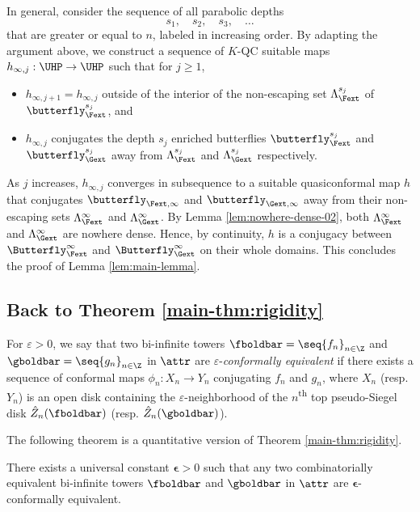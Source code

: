 \documentclass{amsart}
\begin{document}
In general, consider the sequence of all parabolic depths 
\[
    s_1, \quad s_2, \quad s_3, \quad  \ldots
\]
that are greater or equal to $n$, labeled in increasing order. 
By adapting the argument above, we construct a sequence of $K$-QC suitable maps $h_{\infty,j}: \UHP \to \UHP$ such that for $j \geq 1$,
\begin{itemize}
    \item $h_{\infty,j+1} = h_{\infty,j}$ outside of the interior of the non-escaping set $\Lambda_{\Fext}^{s_j}$ of $\butterfly_{\Fext}^{s_j}$, and
    \item $h_{\infty,j}$ conjugates the depth $s_j$ enriched butterflies $\butterfly_{\Fext}^{s_j}$ and $\butterfly_{\Gext}^{s_j}$ away from $\Lambda_{\Fext}^{s_j}$ and $\Lambda_{\Gext}^{s_j}$ respectively.
\end{itemize}
As $j$ increases, $h_{\infty,j}$ converges in subsequence to a suitable quasiconformal map $h$ that conjugates $\butterfly_{\Fext, \infty}$ and $\butterfly_{\Gext, \infty}$ away from their non-escaping sets $\Lambda_{\Fext}^{\infty}$ and $\Lambda_{\Gext}^{\infty}$. 
By Lemma \ref{lem:nowhere-dense-02}, both $\Lambda_{\Fext}^{\infty}$ and $\Lambda_{\Gext}^{\infty}$ are nowhere dense. 
Hence, by continuity, $h$ is a conjugacy between $\Butterfly_{\Fext}^\infty$ and $\Butterfly_{\Gext}^{\infty}$ on their whole domains.
This concludes the proof of Lemma \ref{lem:main-lemma}.

\subsection{Back to Theorem \ref{main-thm:rigidity}}
\label{ss:two-main-theorems}

\begin{definition}
    For $\varepsilon>0$, we say that two bi-infinite towers $\fboldbar = \seq{f_n}_{n\in\Z}$ and $\gboldbar = \seq{g_n}_{n\in\Z}$ in $\attr$ are $\varepsilon$-\emph{conformally equivalent} if there exists a sequence of conformal maps $\phi_n: X_n \to Y_n$ conjugating $f_n$ and $g_n$, where $X_n$ (resp. $Y_n$) is an open disk containing the $\varepsilon$-neighborhood of the $n$\textsuperscript{th} top pseudo-Siegel disk $\hat{Z}_{n}(\fboldbar)$ (resp. $\hat{Z}_n(\gboldbar)$).
\end{definition}

The following theorem is a quantitative version of Theorem \ref{main-thm:rigidity}.

\begin{theorem}
\label{main-thm:rigidity-precise}
    There exists a universal constant $\boldsymbol{\epsilon} > 0$ such that 
    any two combinatorially equivalent bi-infinite towers $\fboldbar$ and $\gboldbar$ in $\attr$ are $\boldsymbol{\epsilon}$-conformally equivalent.
\end{theorem}
\end{document}
